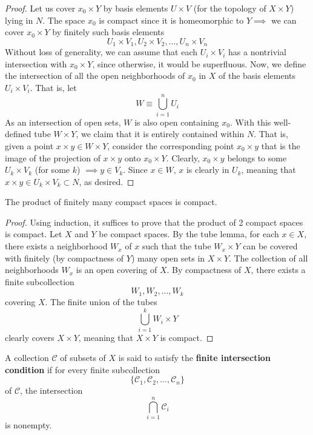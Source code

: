 \documentclass{article}
\begin{document}
    \begin{proof}
    Let us cover $x_0 \times Y$ by basis elements $U \times V$ (for the topology of $X \times Y$) lying in $N$. The space $x_0$ is compact since it is homeomorphic to $Y \implies$ we can cover $x_0 \times Y$ by finitely such basis elements
    \[U_1 \times V_1, U_2 \times V_2, ..., U_n \times V_n\]
    Without loss of generality, we can assume that each $U_i \times V_i$ has a nontrivial intersection with $x_0 \times Y$, since otherwise, it would be superfluous. Now, we define the intersection of all the open neighborhoods of $x_0$ in $X$ of the basis elements $U_i \times V_i$. That is, let
    \[W \equiv \bigcup_{i=1}^n U_i\]
    As an intersection of open sets, $W$ is also open containing $x_0$. With this well-defined tube $W \times Y$, we claim that it is entirely contained within $N$. That is, given a point $x \times y \in W \times Y$, consider the corresponding point $x_0 \times y$ that is the image of the projection of $x\times y$ onto $x_0 \times Y$. Clearly, $x_0 \times y$ belongs to some $U_k \times V_k$ (for some $k$) $\implies y \in V_k$. Since $x \in W$, $x$ is clearly in $U_k$, meaning that $x \times y \in U_k \times V_k \subset N$, as desired. 
    \end{proof}

    \begin{theorem}
    The product of finitely many compact spaces is compact. 
    \end{theorem}
    \begin{proof}
    Using induction, it suffices to prove that the product of 2 compact spaces is compact. Let $X$ and $Y$ be compact spaces. By the tube lemma, for each $x \in X$, there exists a neighborhood $W_x$ of $x$ such that the tube $W_x \times Y$ can be covered with finitely (by compactness of $Y$) many open sets in $X \times Y$. The collection of all neighborhoods $W_x$ is an open covering of $X$. By compactness of $X$, there exists a finite subcollection
    \[W_1, W_2, ..., W_k\]
    covering $X$. The finite union of the tubes 
    \[\bigcup_{i=1}^k W_i \times Y\]
    clearly covers $X \times Y$, meaning that $X \times Y$ is compact. 
    \end{proof}

    \begin{definition}
    A collection $\mathcal{C}$ of subsets of $X$ is said to satisfy the \textbf{finite intersection condition} if for every finite subcollection 
    \[\{\mathcal{C}_1, \mathcal{C}_2, ..., \mathcal{C}_n\}\]
    of $\mathcal{C}$, the intersection
    \[\bigcap_{i=1}^n \mathcal{C}_i\]
    is nonempty. 
    \end{definition}
\end{document}
